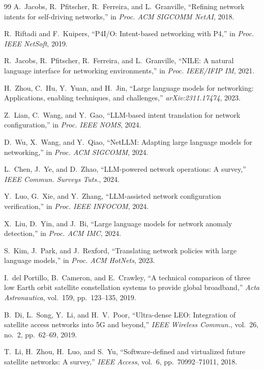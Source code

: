 \documentclass[10pt, conference, letterpaper]{IEEEtran}
\begin{document}
\begin{thebibliography}{99}
A.~Jacobs, R.~Pfitscher, R.~Ferreira, and L.~Granville,
``Refining network intents for self-driving networks,''
in \textit{Proc. ACM SIGCOMM NetAI}, 2018.

R.~Riftadi and F.~Kuipers,
``P4I/O: Intent-based networking with P4,''
in \textit{Proc. IEEE NetSoft}, 2019.

R.~Jacobs, R.~Pfitscher, R.~Ferreira, and L.~Granville,
``NILE: A natural language interface for networking environments,''
in \textit{Proc. IEEE/IFIP IM}, 2021.

H.~Zhou, C.~Hu, Y.~Yuan, and H.~Jin,
``Large language models for networking: Applications, enabling
techniques, and challenges,'' \textit{arXiv:2311.17474}, 2023.

Z.~Lian, C.~Wang, and Y.~Gao,
``LLM-based intent translation for network configuration,''
in \textit{Proc. IEEE NOMS}, 2024.

D.~Wu, X.~Wang, and Y.~Qiao,
``NetLLM: Adapting large language models for networking,''
in \textit{Proc. ACM SIGCOMM}, 2024.

L.~Chen, J.~Ye, and D.~Zhao,
``LLM-powered network operations: A survey,''
\textit{IEEE Commun. Surveys Tuts.}, 2024.

Y.~Luo, G.~Xie, and Y.~Zhang,
``LLM-assisted network configuration verification,''
in \textit{Proc. IEEE INFOCOM}, 2024.

X.~Liu, D.~Yin, and J.~Bi,
``Large language models for network anomaly detection,''
in \textit{Proc. ACM IMC}, 2024.

S.~Kim, J.~Park, and J.~Rexford,
``Translating network policies with large language models,''
in \textit{Proc. ACM HotNets}, 2023.

I.~del Portillo, B.~Cameron, and E.~Crawley,
``A technical comparison of three low Earth orbit satellite
constellation systems to provide global broadband,''
\textit{Acta Astronautica}, vol.~159, pp.~123--135, 2019.

B.~Di, L.~Song, Y.~Li, and H.~V.~Poor,
``Ultra-dense LEO: Integration of satellite access networks into 5G
and beyond,'' \textit{IEEE Wireless Commun.}, vol.~26, no.~2,
pp.~62--69, 2019.

T.~Li, H.~Zhou, H.~Luo, and S.~Yu,
``Software-defined and virtualized future satellite networks: A survey,''
\textit{IEEE Access}, vol.~6, pp.~70992--71011, 2018.


\end{thebibliography}
\end{document}
